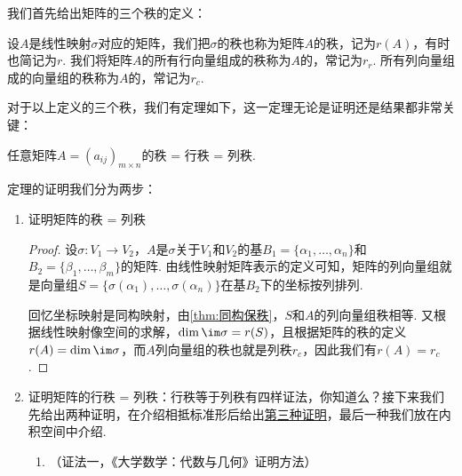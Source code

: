 我们首先给出矩阵的三个秩的定义：
\begin{definition}{}{}
    设$A$是线性映射$\sigma$对应的矩阵，我们把$\sigma$的秩也称为矩阵$A$的秩，记为$r(A)$，有时也简记为$r$. 我们将矩阵$A$的所有行向量组成的秩称为$A$的，常记为$r_r$. 所有列向量组成的向量组的秩称为$A$的，常记为$r_c$.
\end{definition}
对于以上定义的三个秩，我们有定理如下，这一定理无论是证明还是结果都非常关键：
\begin{theorem}{}{}
    任意矩阵$A=(a_{ij})_{m\times n}$的秩 = 行秩 = 列秩.
\end{theorem}
定理的证明我们分为两步：
\begin{enumerate}
    \item 证明矩阵的秩 = 列秩

          \begin{proof}
              设$\sigma:V_1\to V_2$，$A$是$\sigma$关于$V_1$和$V_2$的基$B_1=\{\alpha_1,\ldots,\alpha_n\}$和$B_2=\{\beta_1,\ldots,\beta_m\}$的矩阵. 由线性映射矩阵表示的定义可知，矩阵的列向量组就是向量组$S=\{\sigma(\alpha_1),\ldots,\sigma(\alpha_n)\}$在基$B_2$下的坐标按列排列.

              回忆坐标映射是同构映射，由\autoref{thm:同构保秩}，$S$和$A$的列向量组秩相等. 又根据线性映射像空间的求解，$\dim\im\sigma=r(S)$，且根据矩阵的秩的定义$r(A)=\dim\im\sigma$，而$A$列向量组的秩也就是列秩$r_c$，因此我们有$r(A)=r_c$.
          \end{proof}

    \item 证明矩阵的行秩 = 列秩：行秩等于列秩有四样证法，你知道么？接下来我们先给出两种证明，在介绍相抵标准形后给出\hyperref[pf:11:矩阵行秩=列秩]{第三种证明}，最后一种我们放在内积空间中介绍.
          \begin{enumerate}
              \item （证法一，《大学数学：代数与几何》证明方法）


\end{enumerate}
\end{enumerate}
